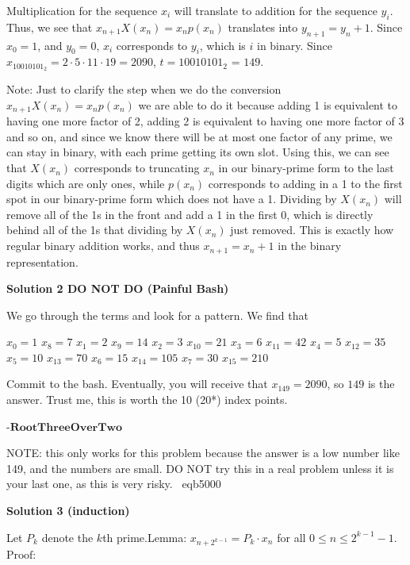 \begin{enumerate}
 Multiplication for the sequence $x_i$ will translate to addition for the sequence $y_i$. Thus, we see that $x_{n+1}X(x_n) = x_np(x_n)$ translates into $y_{n+1} = y_n+1$. Since $x_0=1$, and $y_0=0$, $x_i$ corresponds to $y_i$, which is $i$ in binary. Since $x_{10010101_2} = 2 \cdot 5 \cdot 11 \cdot 19 = 2090$, $t = 10010101_2$ = $\boxed{149}$.

 Note: Just to clarify the step when we do the conversion $x_{n+1}X(x_n) = x_np(x_n)$ we are able to do it because adding 1 is equivalent to having one more factor of 2, adding 2 is equivalent to having one more factor of 3 and so on, and since we know there will be at most one factor of any prime, we can stay in binary, with each prime getting its own slot. Using this, we can see that $X(x_n)$ corresponds to truncating $x_n$ in our binary-prime form to the last digits which are only ones, while $p(x_n)$ corresponds to adding in a 1 to the first spot in our binary-prime form which does not have a 1. Dividing by $X(x_n)$ will remove all of the 1s in the front and add a 1 in the first 0, which is directly behind all of the 1s that dividing by $X(x_n)$ just removed. This is exactly how regular binary addition works, and thus $x_{n+1} = x_n + 1$ in the binary representation.

 



\textbf{Solution 2 DO NOT DO (Painful Bash)}

We go through the terms and look for a pattern. We find that

 $x_0 = 1$ $x_8 = 7$
$x_1 = 2$ $x_9 = 14$
$x_2 = 3$ $x_{10} = 21$
$x_3 = 6$ $x_{11} = 42$
$x_4 = 5$ $x_{12} = 35$
$x_5 = 10$ $x_{13} = 70$
$x_6 = 15$ $x_{14} = 105$
$x_7 = 30$ $x_{15} = 210$

 Commit to the bash. Eventually, you will receive that $x_{149} = 2090$, so $\boxed{149}$ is the answer. Trust me, this is worth the 10 (20*) index points.

 $\textbf{-RootThreeOverTwo}$

 NOTE: this only works for this problem because the answer is a low number like 149, and the numbers are small. DO NOT try this in a real problem unless it is your last one, as this is very risky. ~eqb5000

 



\textbf{Solution 3 (induction)}

Let $P_k$ denote the $k$th prime.Lemma: $x_{n+2^{k-1}} = P_k \cdot x_{n}$ for all $0 \leq n \leq 2^{k-1} - 1.$
$\mathbf{\mathrm{Proof:}}$


\end{enumerate}
